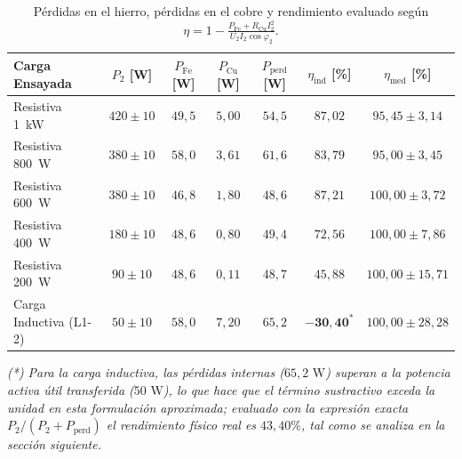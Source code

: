 \begin{table}[htbp]
    \centering
    \caption{Pérdidas en el hierro, pérdidas en el cobre y rendimiento evaluado según $\eta = 1 - \frac{P_{\text{Fe}} + R_{\text{Cu}} I_2^2}{U_2 I_2 \cos\varphi_2}$.}
    \label{tab:perdidas_modelo}
    \begin{tabular}{l c c c c c c}
        \toprule
        \textbf{Carga Ensayada} & \textbf{$P_2$ [W]} & \textbf{$P_{\text{Fe}}$ [W]} & \textbf{$P_{\text{Cu}}$ [W]} & \textbf{$P_{\text{perd}}$ [W]} & \textbf{$\eta_{\text{ind}}$ [\%]} & \textbf{$\eta_{\text{med}}$ [\%]} \\
        \midrule
        Resistiva 1~kW & $420 \pm 10$ & $49{,}5$ & $5{,}00$ & $54{,}5$ & $87{,}02$ & $95{,}45 \pm 3{,}14$ \\
        Resistiva 800~W & $380 \pm 10$ & $58{,}0$ & $3{,}61$ & $61{,}6$ & $83{,}79$ & $95{,}00 \pm 3{,}45$ \\
        Resistiva 600~W & $380 \pm 10$ & $46{,}8$ & $1{,}80$ & $48{,}6$ & $87{,}21$ & $100{,}00 \pm 3{,}72$ \\
        Resistiva 400~W & $180 \pm 10$ & $48{,}6$ & $0{,}80$ & $49{,}4$ & $72{,}56$ & $100{,}00 \pm 7{,}86$ \\
        Resistiva 200~W & $90 \pm 10$ & $48{,}6$ & $0{,}11$ & $48{,}7$ & $45{,}88$ & $100{,}00 \pm 15{,}71$ \\
        \midrule
        Carga Inductiva (L1-2) & $50 \pm 10$ & $58{,}0$ & $7{,}20$ & $65{,}2$ & $\mathbf{-30{,}40^*}$ & $100{,}00 \pm 28{,}28$ \\
        \bottomrule
    \end{tabular}
    \par\smallskip
    \footnotesize\textit{(*) Para la carga inductiva, las pérdidas internas ($65{,}2\text{ W}$) superan a la potencia activa útil transferida ($50\text{ W}$), lo que hace que el término sustractivo exceda la unidad en esta formulación aproximada; evaluado con la expresión exacta $P_2/(P_2+P_{\text{perd}})$ el rendimiento físico real es $43{,}40\%$, tal como se analiza en la sección siguiente.}
\end{table}
